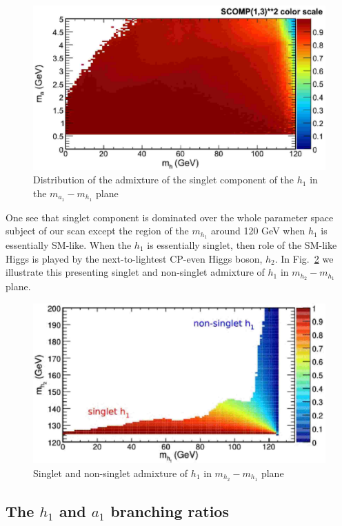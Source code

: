 \documentclass[aps,12pt,superscriptaddress,nofootinbib,floatfix,showpacs]{revtex4}
\begin{document}
\begin{figure}[htb]
\begin{center}
\includegraphics[width=0.75\linewidth]{plots/ma-vs-mh-vs-scomp.eps}
\caption{Distribution of the admixture of the singlet component of  the
$h_1$ in the $m_{a_1}-m_{h_1}$ plane
\label{ma-vs-mh-vs-scomp}}
\end{center}
\end{figure}
One see that singlet component is dominated over the
whole parameter space subject of our scan except the region 
of the $m_{h_1}$ around 120 GeV when $h_1$ is essentially SM-like.
When the $h_1$ is essentially singlet, then role of the SM-like Higgs
is played by the next-to-lightest CP-even Higgs boson, $h_2$.
In Fig.~\ref{mh2-mh1-scomp} we illustrate this
presenting 
singlet and non-singlet admixture of $h_1$
in $m_{h_2}-m_{h_1}$ plane.
\begin{figure}[htb]
\begin{center}
\includegraphics[width=0.75\linewidth]{plots/mh2-mh1-singlet.eps}
\caption{Singlet and non-singlet admixture of $h_1$
in $m_{h_2}-m_{h_1}$ plane
\label{mh2-mh1-scomp}}
\end{center}
\end{figure}

\subsection{The $h_1$ and $a_1$ branching ratios}
\end{document}
